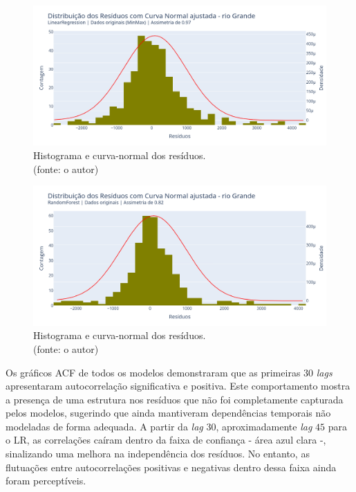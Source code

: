 \begin{figure}[!h]
	\centering
	\includegraphics[scale=0.33]{Figuras/rio_grande/wfv/LR/LR_WFV_ORIG_RESID_x_CURVA_NORMAL.png}
	\caption{Histograma e curva-normal dos resíduos.\\(fonte: o autor)}
	\label{fig:grande_LR_WFV_ORIG_RESID_x_CURVA_NORMAL}
\end{figure}

\begin{figure}[!h]
	\centering
	\includegraphics[scale=0.33]{Figuras/rio_grande/wfv/RF/RF_WFV_ORIG_RESID_x_CURVA_NORMAL.png}
	\caption{Histograma e curva-normal dos resíduos.\\(fonte: o autor)}
	\label{fig:grande_RF_WFV_ORIG_RESID_x_CURVA_NORMAL}
\end{figure}
\clearpage

Os gráficos ACF de todos os modelos demonstraram que as primeiras $30$ \textit{lags} apresentaram autocorrelação significativa e positiva. Este comportamento mostra a presença de uma estrutura nos resíduos que não foi completamente capturada pelos modelos, sugerindo que ainda mantiveram dependências temporais não modeladas de forma adequada. A partir da \textit{lag} $30$, aproximadamente \textit{lag} $45$ para o LR, as correlações caíram dentro da faixa de confiança - área azul clara -, sinalizando uma melhora na independência dos resíduos. No entanto, as flutuações entre autocorrelações positivas e negativas dentro dessa faixa ainda foram perceptíveis.

